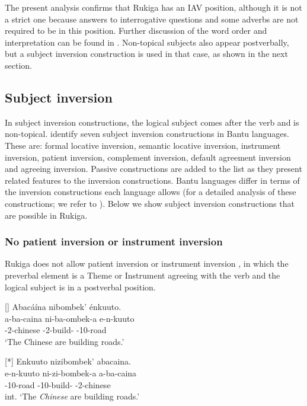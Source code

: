 \documentclass[output=paper]{langscibook}
\begin{document}
\z

The present analysis confirms that Rukiga has an IAV position, although it is not a strict one because answers to interrogative questions and some adverbs are not required to be in this position. Further discussion of the word order and interpretation can be found in \citet{KerrEtAl2023}. Non-topical subjects also appear postverbally, but a subject inversion construction is used in that case, as shown in the next section.

\subsection{Subject inversion}
\label{bkm:Ref100083142}
In subject inversion constructions, the logical subject comes after the verb and is non-topical. \citet{MartenvanderWal2014} identify seven subject inversion constructions in Bantu languages. These are: formal locative inversion, semantic locative inversion, instrument inversion, patient inversion, complement inversion, default agreement inversion and agreeing inversion. Passive constructions are added to the list as they present related features to the inversion constructions. Bantu languages differ in terms of the inversion constructions each language allows (for a detailed analysis of these constructions; we refer to \citealt{MartenvanderWal2014}). Below we show subject inversion constructions that are possible in Rukiga.

\subsubsection{No patient inversion or instrument inversion}

Rukiga does not allow patient inversion  or instrument inversion , in which the preverbal element is a Theme or Instrument agreeing with the verb and the logical subject is in a postverbal position. 

\ea
\label{bkm:Ref135654256}
\ea
[]{
Abacáína nibombek’ énkuuto.\\
\gll
a-ba-caina  ni-ba-ombek-a  e-n-kuuto\\
\AUG{}-2-chinese  \IPFV{}-2\SM{}-build-\FV{}  \AUG{}-10-road\\
\glt
‘The Chinese are building roads.’\\
}


\ex
[*]{
Enkuuto nizibombek’ abacaina.\\
\gll
e-n-kuuto  ni-zi-bombek-a  a-ba-caina\\
\AUG{}-10-road  \IPFV{}-10\SM{}-build-\FV{}  \AUG{}-2-chinese\\
\glt
int. ‘The \textit{Chinese} are building roads.’\\
}
\end{document}
